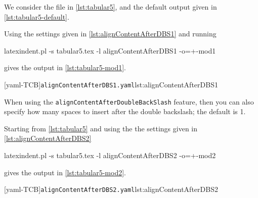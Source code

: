  \begin{example}
 We consider the file in \cref{lst:tabular5}, and the default output given in
 \cref{lst:tabular5-default}.

 \begin{cmhtcbraster}
 \end{cmhtcbraster}

 Using the settings given in \cref{lst:alignContentAfterDBS1} and running

 \begin{commandshell}
latexindent.pl -s tabular5.tex -l alignContentAfterDBS1 -o=+-mod1
\end{commandshell}

 gives the output in \cref{lst:tabular5-mod1}.

 \begin{cmhtcbraster}[raster columns=2,
   raster left skip=-2.5cm,
   raster column skip=.03\linewidth]
  [yaml-TCB]{\texttt{alignContentAfterDBS1.yaml}}{lst:alignContentAfterDBS1}
 \end{cmhtcbraster}
 \end{example}

 \begin{example}
 When using the \texttt{alignContentAfterDoubleBackSlash} feature, then you can also
 specify how many spaces to insert after the double backslash; the default is 1.

 Starting from \cref{lst:tabular5} and using the the settings given in
 \cref{lst:alignContentAfterDBS2}

 \begin{commandshell}
latexindent.pl -s tabular5.tex -l alignContentAfterDBS2 -o=+-mod2
\end{commandshell}

 gives the output in \cref{lst:tabular5-mod2}.

 \begin{cmhtcbraster}[raster columns=2,
   raster left skip=-2.5cm,
   raster column skip=.03\linewidth]
  [yaml-TCB]{\texttt{alignContentAfterDBS2.yaml}}{lst:alignContentAfterDBS2}
 \end{cmhtcbraster}
 \end{example}

